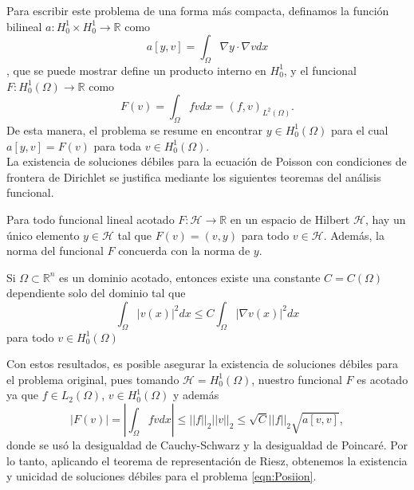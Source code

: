 \documentclass{article}
\begin{document}
\noindent
Para escribir este problema de una forma más compacta, definamos la función bilineal $a:H_{0}^{1}\times H_{0}^{1}\to \mathbb{R}$ como 
\begin{equation}a[y, v]=\int_{\Omega} \nabla y \cdot \nabla v d x\end{equation}, que se puede mostrar define un producto interno en $H_{0}^{1}$,
y el funcional $F:H_{0}^{1}(\Omega) \to \mathbb{R}$ como 
\begin{equation}
F(v)=\int_{\Omega}fv dx=(f, v)_{L^{2}(\Omega)}.
\end{equation} 
De esta manera, el problema se resume en encontrar $y\in H_{0}^{1}(\Omega)$ para el cual $a[y,v]=F(v)$ para toda $v\in H_{0}^{1}(\Omega) $.\\

\noindent
La existencia de soluciones débiles para la ecuación de Poisson con condiciones de frontera de Dirichlet se justifica mediante los siguientes teoremas del análisis funcional.

\begin{theorem}
Para todo funcional lineal acotado $F:\mathcal{H}\to \mathbb{R}$ en un espacio de Hilbert $\mathcal{H}$, hay un único elemento $y\in \mathcal{H}$ tal que $F(v)=(v,y)$ para todo $v\in \mathcal{H}$. Además, la norma del funcional $F$ concuerda con la norma de $y$.
\end{theorem}

\begin{theorem}
Si $\Omega\subset\mathbb{R}^n$ es un dominio acotado, entonces existe una constante $C=C(\Omega)$ dependiente solo del dominio tal que 
\begin{equation}
    \int_{\Omega}|v(x)|^2 dx \leq C\int_{\Omega}|\nabla v(x)|^2 dx
\end{equation}
para todo $v\in H_{0}^{1}(\Omega) $
\end{theorem}

\noindent
Con estos resultados, es posible asegurar la existencia de soluciones débiles para el problema original, pues tomando $\mathcal{H}=H_{0}^{1}(\Omega)$, nuestro funcional $F$ es acotado ya que  $f\in L_2(\Omega)$, $v\in H_{0}^{1}(\Omega)$ y además
\begin{equation}
    |F(v)|=\left|\int_{\Omega}fvdx\right|\leq ||f||_2||v||_2\leq\sqrt{C}||f||_2 \sqrt{a[v,v]},
\end{equation}
donde se usó la desigualdad de Cauchy-Schwarz y la desigualdad de Poincaré. Por lo tanto, aplicando el teorema de representación de Riesz, obtenemos la existencia y unicidad de soluciones débiles para el problema \ref{eqn:Posiion}.\\
\end{document}
